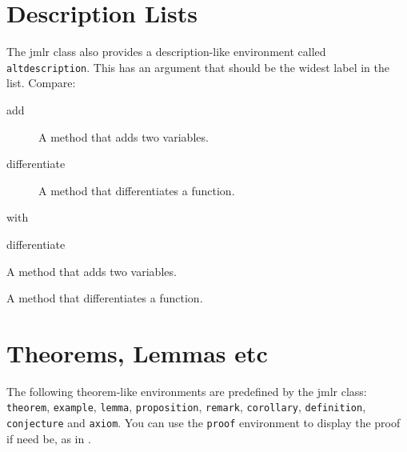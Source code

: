 \documentclass[pmlr,twocolumn,10pt]{jmlr} %
\begin{document}
\section{Description Lists}

The \textsf{jmlr} class also provides a description-like 
environment called \texttt{altdescription}. This has an
argument that should be the widest label in the list. Compare:
\begin{description}
\item[add] A method that adds two variables.
\item[differentiate] A method that differentiates a function.
\end{description}
with
\begin{altdescription}{differentiate}
\item[add] A method that adds two variables.
\item[differentiate] A method that differentiates a function.
\end{altdescription}

\section{Theorems, Lemmas etc}
\label{sec:theorems}

The following theorem-like environments are predefined by
the \textsf{jmlr} class: \texttt{theorem}, \texttt{example},
\texttt{lemma}, \texttt{proposition}, \texttt{remark}, 
\texttt{corollary}, \texttt{definition}, \texttt{conjecture}
and \texttt{axiom}. You can use the \texttt{proof} environment
to display the proof if need be, as in .
\end{document}
